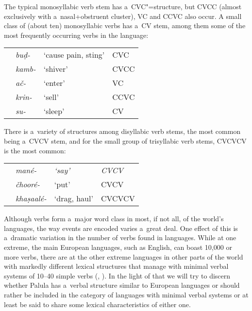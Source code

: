 The typical monosyllabic verb stem has a~CVC"=structure, but CVCC (almost exclusively with a~nasal+obstruent cluster), VC and CCVC also occur. A small class of (about ten) monosyllabic verbs has a~CV stem, among them some of the most frequently occurring verbs in the language:

\begin{table}[H]
\begin{tabularx}{\textwidth}{ l l l l }
&
\textit{buḍ-} &
`cause pain, sting' &
CVC\\
&
\textit{kamb-} &
`shiver' &
CVCC\\
&
\textit{ač-} &
`enter' &
VC\\
&
\textit{krin-} &
`sell' &
CCVC\\
&
\textit{su-} &
`sleep' &
CV\\
\end{tabularx}
\end{table}

There is a~variety of structures among disyllabic verb stems, the most common being a~CVCV stem, and for the small group of trisyllabic verb stems, CVCVCV is the most common:

\begin{table}[H]
\begin{tabularx}{\textwidth}{ l l l l }
&
\textit{mané-} &
\textit{\textup{`say'}} &
\textit{\textup{CVCV}} \\
&
\textit{čhooré-} &
`put' &
CVCV\\
&
\textit{khaṣaalé-} &
`drag, haul' &
CVCVCV\\
\end{tabularx}
\end{table}

Although verbs form a~major word class in most, if not all, of the world's languages, the way events are encoded varies a~great deal. One effect of this is a~dramatic variation in the number of verbs found in languages. While at one extreme, the main European languages, such as English, can boast 10,000 or more verbs, there are at the other extreme languages in other parts of the world with markedly different lexical structures that manage with minimal verbal systems of 10--40 simple verbs (\citealt[347--348]{viberg1993}, \citeyear[409]{viberg2006}). In the light of that we will try to discern whether Palula has a~verbal structure similar to European languages or should rather be included in the category of languages with minimal verbal systems or at least be said to share some lexical characteristics of either one.



